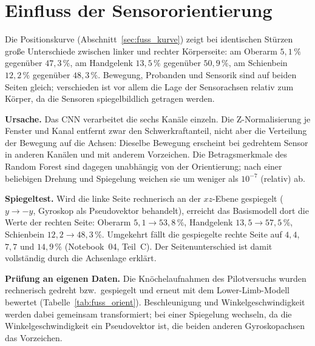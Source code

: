 \documentclass[11pt,a4paper,oneside]{report}
\begin{document}
\section{Einfluss der Sensororientierung}
\label{sec:fuss_orient}

Die Positionskurve (Abschnitt~\ref{sec:fuss_kurve}) zeigt bei
identischen Stürzen große Unterschiede zwischen linker und rechter
Körperseite: am Oberarm $5{,}1\,\%$ gegenüber $47{,}3\,\%$, am
Handgelenk $13{,}5\,\%$ gegenüber $50{,}9\,\%$, am Schienbein
$12{,}2\,\%$ gegenüber $48{,}3\,\%$. Bewegung, Probanden und Sensorik
sind auf beiden Seiten gleich; verschieden ist vor allem die Lage der
Sensorachsen relativ zum Körper, da die Sensoren spiegelbildlich
getragen werden.

\textbf{Ursache.} Das CNN verarbeitet die sechs Kanäle einzeln. Die
Z-Normalisierung je Fenster und Kanal entfernt zwar den
Schwerkraftanteil, nicht aber die Verteilung der Bewegung auf die
Achsen: Dieselbe Bewegung erscheint bei gedrehtem Sensor in anderen
Kanälen und mit anderem Vorzeichen. Die Betragsmerkmale des Random
Forest sind dagegen unabhängig von der Orientierung; nach einer
beliebigen Drehung und Spiegelung weichen sie um weniger als $10^{-7}$
(relativ) ab.

\textbf{Spiegeltest.} Wird die linke Seite rechnerisch an der
$xz$-Ebene gespiegelt ($y \to -y$, Gyroskop als Pseudovektor
behandelt), erreicht das Basismodell dort die Werte der rechten Seite:
Oberarm $5{,}1 \to 53{,}8\,\%$, Handgelenk $13{,}5 \to 57{,}5\,\%$,
Schienbein $12{,}2 \to 48{,}3\,\%$. Umgekehrt fällt die gespiegelte
rechte Seite auf $4{,}4$, $7{,}7$ und $14{,}9\,\%$ (Notebook~04, Teil~C).
Der Seitenunterschied ist damit vollständig durch die Achsenlage
erklärt.

\textbf{Prüfung an eigenen Daten.} Die Knöchelaufnahmen des
Pilotversuchs wurden rechnerisch gedreht bzw.\ gespiegelt und erneut
mit dem Lower-Limb-Modell bewertet (Tabelle~\ref{tab:fuss_orient}).
Beschleunigung und Winkelgeschwindigkeit werden dabei gemeinsam
transformiert; bei einer Spiegelung wechseln, da die
Winkelgeschwindigkeit ein Pseudovektor ist, die beiden anderen
Gyroskopachsen das Vorzeichen.
\end{document}
